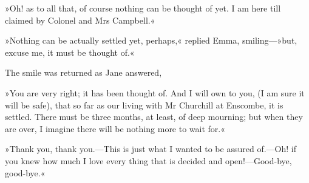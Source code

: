 »Oh! as to all that, of course nothing can be thought of yet. I am here till claimed by Colonel and Mrs Campbell.«

»Nothing can be actually settled yet, perhaps,« replied Emma, smiling—»but, excuse me, it must be thought of.«

The smile was returned as Jane answered,

»You are very right; it has been thought of. And I will own to you, (I am sure it will be safe), that so far as our living with Mr Churchill at Enscombe, it is settled. There must be three months, at least, of deep mourning; but when they are over, I imagine there will be nothing more to wait for.«

»Thank you, thank you.—This is just what I wanted to be assured of.—Oh! if you knew how much I love every thing that is decided and open!—Good-bye, good-bye.«